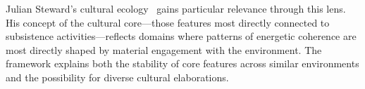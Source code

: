 Julian Steward's cultural ecology~ gains particular relevance through this lens. His concept of the cultural core---those features most directly connected to subsistence activities---reflects domains where patterns of energetic coherence are most directly shaped by material engagement with the environment. The framework explains both the stability of core features across similar environments and the possibility for diverse cultural elaborations.








